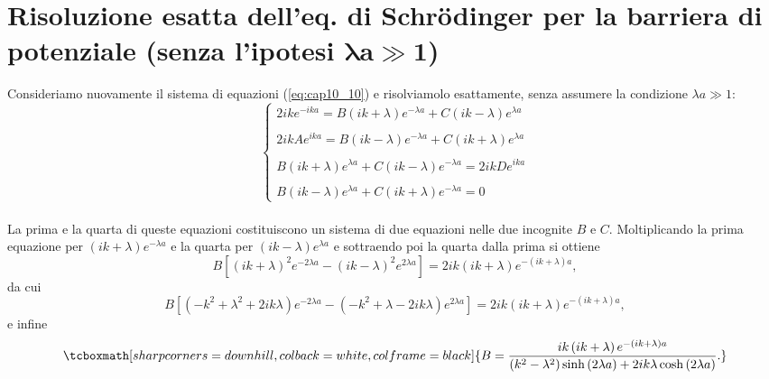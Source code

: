 \documentclass[a4paper,12pt,oneside]{book}
\begin{document}
\section{Risoluzione esatta dell'eq. di Schr\"{o}dinger per la barriera di potenziale (senza l'ipotesi $\mathbf{\lambda a \gg 1} $)}
Consideriamo nuovamente il sistema di equazioni (\ref{eq:cap10_10}) e risolviamolo esattamente, senza assumere la condizione $\lambda a \gg 1 $:
\begin{equation}
		\begin{cases}
		\displaystyle{2ike^{-ika}= B \left(ik+\lambda\right)e^{-\lambda a} +C \left(ik-\lambda\right)e^{\lambda a} }\\
		\\
		\displaystyle{2ikAe^{ika}= B \left(ik-\lambda\right)e^{-\lambda a} +C \left(ik+\lambda\right)e^{\lambda a} }\\
		\\
		\displaystyle{B\left(ik+\lambda\right)e^{\lambda a} + C\left(ik-\lambda\right)e^{-\lambda a} = 2ikD e^{ika}}\\
		\\
		\displaystyle{B\left(ik-\lambda\right)e^{\lambda a} + C\left(ik+\lambda\right)e^{-\lambda a} =0}
		\end{cases}
	\end{equation}\\

La prima e la quarta di queste equazioni costituiscono un sistema di due equazioni nelle due incognite $B$ e $C$. Moltiplicando la prima equazione per $(ik+\lambda) e^{-\lambda a }$ e la quarta per $(ik-\lambda) e^{\lambda a }$ e sottraendo poi la quarta dalla prima si ottiene
	\begin{equation}
		B\left[ (ik+\lambda)^2 e^{-2\lambda a }-(ik-\lambda)^2 e^{2\lambda a }\right]= 2ik(ik+\lambda) e^{-\left(ik+\lambda\right) a },
	\end{equation} 
da cui
	\begin{equation}
		B\left[ (-k^2+\lambda ^2+2ik\lambda) e^{-2\lambda a }-(-k^2+\lambda-2ik\lambda) e^{2\lambda a }\right]= 2ik(ik+\lambda) e^{-\left(ik+\lambda\right) a },
	\end{equation}
e infine
	\begin{equation}
		\tcboxmath[sharp corners=downhill, colback=white, colframe=black]{
			B=\frac{ik\left(ik+\lambda \right)e^{-\left(ik+\lambda\right) a }}{\left(k^2-\lambda^2\right)\sinh \left(2\lambda a\right)+2ik\lambda \cosh\left(2\lambda a\right)}.
			}
	\end{equation}\\
	
\end{document}
